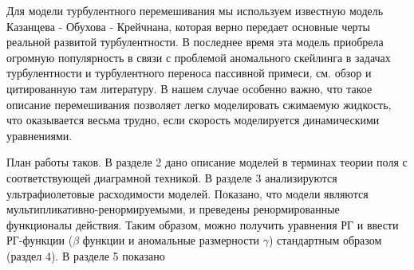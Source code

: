 \documentclass []{rusthesis} %
\begin{document}
Для модели турбулентного перемешивания мы используем известную модель Казанцева - Обухова - Крейчнана, которая верно передает основные черты реальной развитой турбулентности. В последнее время эта модель приобрела огромную популярность в связи с проблемой аномального скейлинга в задачах турбулентности и турбулентного переноса пассивной примеси, см. обзор \cite{JT} и цитированную там литературу. В нашем случае особенно важно, что такое описание перемешивания позволяет легко моделировать сжимаемую жидкость, что оказывается весьма трудно, если скорость моделируется динамическими уравнениями.


План работы таков. В разделе 2 дано описание моделей в терминах теории поля с соответствующей диаграмной техникой. В разделе 3 анализируются ультрафиолетовые расходимости моделей. Показано, что модели являются мультипликативно-ренормируемыми, и преведены ренормированные функционалы действия. Таким образом, можно получить уравнения РГ и ввести РГ-функции ($\beta$ функции и аномальные размерности $\gamma$) стандартным образом (раздел 4). В разделе 5 показано
\end{document}
